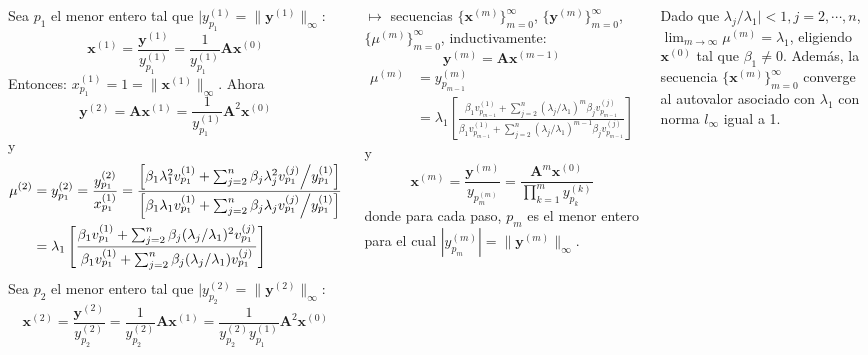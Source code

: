 \documentclass[9pt, aspectratio=169]{beamer}
\begin{document}
\begin{frame}
\begin{columns}[t]
\cx
Sea $p_1$ el menor entero tal que $|y_{p_1}^{(1)} = \lVert \bm{y}^{(1)} \rVert_{\infty}$:
\[ \bm{x}^{(1)} = \frac{\bm{y}^{(1)}}{y_{p_1}^{(1)}} = \frac{1}{y_{p_1}^{(1)}} \bm{A} \bm{x}^{(0)} \]
Entonces: $x_{p_1}^{(1)} = 1 = \lVert \bm{x}^{(1)} \rVert_{\infty}$. Ahora
\[ \bm{y}^{(2)} = \bm{A} \bm{x}^{(1)} = \frac{1}{y_{p_1}^{(1)}} \bm{A}^2 \bm{x}^{(0)} \]
y
\begin{align*}
    \mu^{(2)} &= y_{p_1}^{(2)} = \frac{y_{p_1}^{(2)}}{x_{p_1}^{(1)}} = \frac{ \left[ \beta_1 \lambda_1^2 v_{p_1}^{(1)} + \sum_{j=2}^n \beta_j \lambda_j^2 v_{p_1}^{(j)} \middle/ y_{p_1}^{(1)} \right]}{ \left[ \beta_1 \lambda_1 v_{p_1}^{(1)} + \sum_{j=2}^n \beta_j \lambda_j v_{p_1}^{(j)} \middle/ y_{p_1}^{(1)} \right]} \\
              &= \lambda_1 \left[ \frac{\beta_1 v_{p_1}^{(1)} + \sum_{j=2}^n \beta_j (\lambda_j/\lambda_1)^2 v_{p_1}^{(j)}}{\beta_1 v_{p_1}^{(1)} + \sum_{j=2}^n \beta_j (\lambda_j/\lambda_1) v_{p_1}^{(j)}} \right]
\end{align*}
Sea $p_2$ el menor entero tal que $|y_{p_2}^{(2)} = \lVert \bm{y}^{(2)} \rVert_{\infty}$:
\[ \bm{x}^{(2)} = \frac{\bm{y}^{(2)}}{y_{p_2}^{(2)}} = \frac{1}{y_{p_2}^{(2)}} \bm{A} \bm{x}^{(1)} = \frac{1}{y_{p_2}^{(2)} y_{p_1}^{(1)}} \bm{A}^2 \bm{x}^{(0)} \]

\cx
$\mapsto$ secuencias $\{ \bm{x}^{(m)} \}_{m=0}^{\infty}$, $\{ \bm{y}^{(m)} \}_{m=0}^{\infty}$, $\{ \mu^{(m)} \}_{m=0}^{\infty}$, inductivamente:
\[ \bm{y}^{(m)} = \bm{A} \bm{x}^{(m-1)} \] 
\begin{align*} \mu^{(m)} &= y_{p_{m - 1}}^{(m)} \\
&= \lambda_1 \left[ \frac{\beta_1 v_{p_{m-1}}^{(1)} + \sum_{j=2}^n (\lambda_j/\lambda_1)^m \beta_j v_{p_{m-1}}^{(j)}}{\beta_1 v_{p_{m-1}}^{(1)} + \sum_{j=2}^n (\lambda_j/\lambda_1)^{m-1} \beta_j v_{p_{m-1}}^{(j)}} \right] \end{align*}
y
\[ \bm{x}^{(m)} = \frac{\bm{y}^{(m)}}{y_{p_{m}^{(m)}}} = \frac{\bm{A}^m \bm{x}^{(0)}}{ \prod_{k=1}^m y_{p_k}^{(k)}} \]
donde para cada paso, $p_m$ es el menor entero para el cual $|y_{p_m}^{(m)}| = \lVert \bm{y}^{(m)} \rVert_{\infty}$.

Dado que $\lambda_j/\lambda_1| < 1, j=2, \cdots, n$, $\lim_{m \rightarrow \infty} \mu^{(m)} = \lambda_1$, eligiendo $\bm{x}^{(0)}$ tal que $\beta_1 \neq 0$. Además, la secuencia $\{ \bm{x}^{(m)} \}_{m=0}^{\infty}$ converge al autovalor asociado con $\lambda_1$ con norma $l_{\infty}$ igual a 1.
\end{columns}
\end{frame}
\end{document}
